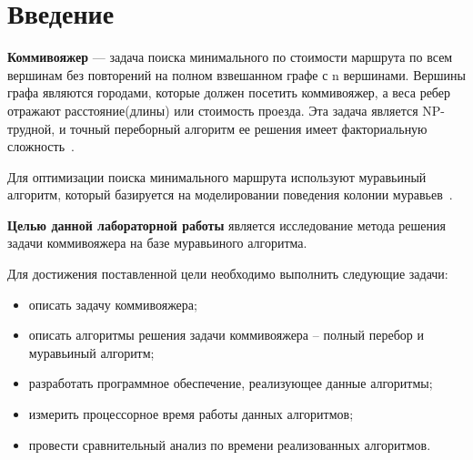 \section*{Введение}

\textbf{Коммивояжер} --- задача поиска минимального по стоимости маршрута по всем вершинам без 
повторений на полном взвешанном графе с n вершинами. Вершины графа являются городами, 
которые должен посетить коммивояжер, а веса ребер отражают расстояние(длины) или стоимость проезда.
Эта задача является NP-трудной, и точный переборный алгоритм ее решения имеет 
факториальную сложность~\cite{Ulianov}.

Для оптимизации поиска минимального маршрута используют муравьиный алгоритм, который базируется
на моделировании поведения колонии муравьев~\cite{Shtovba}.

\textbf{Целью данной лабораторной работы} является исследование метода 
решения задачи коммивояжера на базе муравьиного алгоритма.

Для достижения поставленной цели необходимо выполнить следующие задачи:
\begin{itemize}
    \item описать задачу коммивояжера;
    \item описать алгоритмы решения задачи коммивояжера -- полный перебор и муравьиный алгоритм;
    \item разработать программное обеспечение, реализующее данные алгоритмы;
    \item измерить процессорное время работы данных алгоритмов;
    \item провести сравнительный анализ по времени реализованных алгоритмов.
\end{itemize}
